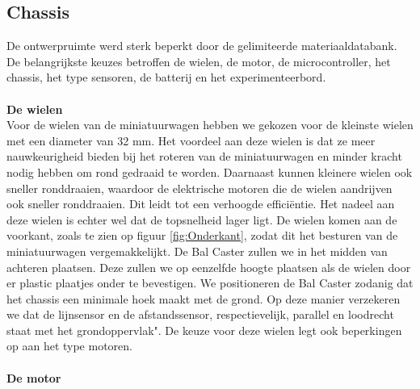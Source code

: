 \documentclass[a4paper,kulak]{kulakarticle}
\begin{document}
\subsection{Chassis}
De ontwerpruimte werd sterk beperkt door de gelimiteerde materiaaldatabank. De belangrijkste keuzes betroffen de wielen, de motor, de microcontroller, het chassis, het type sensoren, de batterij en het experimenteerbord.
\\\\ \textbf{\large De wielen} \\
Voor de wielen van de miniatuurwagen hebben we gekozen voor de kleinste wielen met een diameter van 32 mm. Het voordeel aan deze wielen is dat ze meer nauwkeurigheid bieden bij het roteren van de miniatuurwagen en minder kracht nodig hebben om rond gedraaid te worden. Daarnaast kunnen kleinere wielen ook sneller ronddraaien, waardoor de elektrische motoren die de wielen aandrijven ook sneller ronddraaien. Dit leidt tot een verhoogde efficiëntie. Het nadeel aan deze wielen is echter wel dat de topsnelheid lager ligt. De wielen komen aan de voorkant, zoals te zien op figuur \ref{fig:Onderkant}, zodat dit het besturen van de miniatuurwagen vergemakkelijkt. De Bal Caster zullen we in het midden van achteren plaatsen. Deze zullen we op eenzelfde hoogte plaatsen als de wielen door er plastic plaatjes onder te bevestigen. We positioneren de Bal Caster zodanig dat het chassis een minimale hoek maakt met de grond. Op deze manier verzekeren we dat de lijnsensor en de afstandssensor, respectievelijk, parallel en loodrecht staat met het grondoppervlak". De keuze voor deze wielen legt ook beperkingen op aan het type motoren.
\\\\ \textbf{\large De motor}
\end{document}
